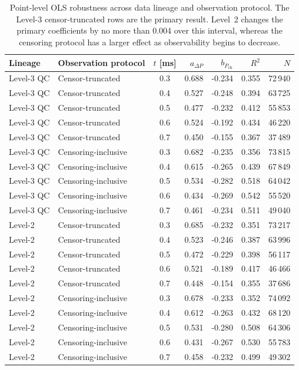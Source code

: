 \begin{table}[!ht]
\centering
\scriptsize
\setlength{\tabcolsep}{4pt}
\begin{tabular}{@{}llcrrrr@{}}
\toprule
Lineage & Observation protocol & $t$ [ms] & $a_{\Delta P}$ & $b_{P_{\mathrm{ch}}}$ & $R^2$ & $N$ \\
\midrule
Level-3 QC & Censor-truncated & 0.3 & 0.688 & -0.234 & 0.355 & 72\,940 \\
Level-3 QC & Censor-truncated & 0.4 & 0.527 & -0.248 & 0.394 & 63\,725 \\
Level-3 QC & Censor-truncated & 0.5 & 0.477 & -0.232 & 0.412 & 55\,853 \\
Level-3 QC & Censor-truncated & 0.6 & 0.524 & -0.192 & 0.434 & 46\,220 \\
Level-3 QC & Censor-truncated & 0.7 & 0.450 & -0.155 & 0.367 & 37\,489 \\
\addlinespace
Level-3 QC & Censoring-inclusive & 0.3 & 0.682 & -0.235 & 0.356 & 73\,815 \\
Level-3 QC & Censoring-inclusive & 0.4 & 0.615 & -0.265 & 0.439 & 67\,849 \\
Level-3 QC & Censoring-inclusive & 0.5 & 0.534 & -0.282 & 0.518 & 64\,042 \\
Level-3 QC & Censoring-inclusive & 0.6 & 0.434 & -0.269 & 0.542 & 55\,520 \\
Level-3 QC & Censoring-inclusive & 0.7 & 0.461 & -0.234 & 0.511 & 49\,040 \\
\addlinespace
Level-2 & Censor-truncated & 0.3 & 0.685 & -0.232 & 0.351 & 73\,217 \\
Level-2 & Censor-truncated & 0.4 & 0.523 & -0.246 & 0.387 & 63\,996 \\
Level-2 & Censor-truncated & 0.5 & 0.472 & -0.229 & 0.398 & 56\,117 \\
Level-2 & Censor-truncated & 0.6 & 0.521 & -0.189 & 0.417 & 46\,466 \\
Level-2 & Censor-truncated & 0.7 & 0.448 & -0.154 & 0.355 & 37\,686 \\
\addlinespace
Level-2 & Censoring-inclusive & 0.3 & 0.678 & -0.233 & 0.352 & 74\,092 \\
Level-2 & Censoring-inclusive & 0.4 & 0.612 & -0.263 & 0.432 & 68\,120 \\
Level-2 & Censoring-inclusive & 0.5 & 0.531 & -0.280 & 0.508 & 64\,306 \\
Level-2 & Censoring-inclusive & 0.6 & 0.431 & -0.267 & 0.530 & 55\,783 \\
Level-2 & Censoring-inclusive & 0.7 & 0.458 & -0.232 & 0.499 & 49\,302 \\
\bottomrule
\end{tabular}
\caption{Point-level OLS robustness across data lineage and observation protocol.
The Level-3 censor-truncated rows are the primary result. Level~2 changes the
primary coefficients by no more than 0.004 over this interval, whereas the
censoring protocol has a larger effect as observability begins to decrease.}
\label{tab:time-scaling-lineage-protocol}
\end{table}


